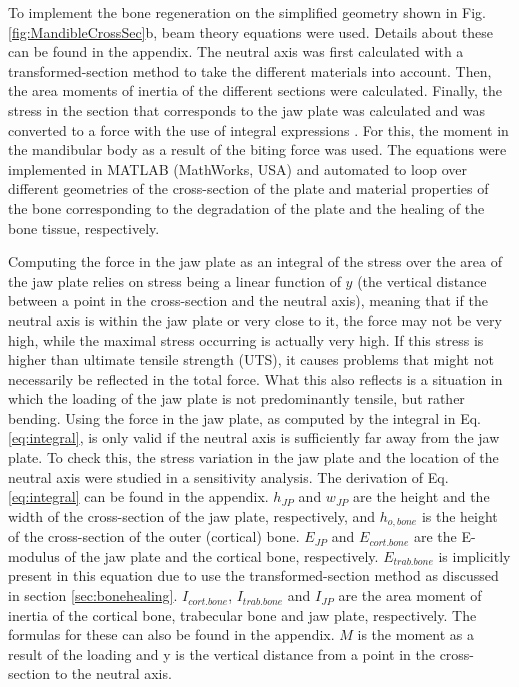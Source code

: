To implement the bone regeneration on the simplified geometry shown in Fig. \ref{fig:MandibleCrossSec}b, beam theory equations were used. Details about these can be found in the appendix. The neutral axis was first calculated with a transformed-section method to take the different materials into account. Then, the area moments of inertia of the different sections were calculated. Finally, the stress in the section that corresponds to the jaw plate was calculated and was converted to a force with the use of integral expressions \cite{beamtheory}. For this, the moment in the mandibular body as a result of the biting force was used. The equations were implemented in MATLAB (MathWorks, USA) and automated to loop over different geometries of the cross-section of the plate and material properties of the bone corresponding to the degradation of the plate and the healing of the bone tissue, respectively.

Computing the force in the jaw plate as an integral of the stress over the area of the jaw plate relies on stress being a linear function of $y$ (the vertical distance between a point in the cross-section and the neutral axis), meaning that if the neutral axis is within the jaw plate or very close to it, the force may not be very high, while the maximal stress occurring is actually very high. If this stress is higher than ultimate tensile strength ({UTS}), it causes problems that might not necessarily be reflected in the total force. What this also reflects is a situation in which the loading of the jaw plate is not predominantly tensile, but rather bending. Using the force in the jaw plate, as computed by the integral in Eq. \ref{eq:integral}, is only valid if the neutral axis is sufficiently far away from the jaw plate. To check this, the stress variation in the jaw plate and the location of the neutral axis were studied in a sensitivity analysis. The derivation of Eq. \ref{eq:integral} can be found in the appendix. $h_{JP}$ and $w_{JP}$ are the height and the width of the cross-section of the jaw plate, respectively, and $h_{o,bone}$ is the height of the cross-section of the outer (cortical) bone. $E_{JP}$ and $E_{cort.bone}$ are the E-modulus of the jaw plate and the cortical bone, respectively. $E_{trab.bone}$ is implicitly present in this equation due to use the transformed-section method as discussed in section \ref{sec:bonehealing}. $I_{cort.bone}$, $I_{trab.bone}$ and $I_{JP}$ are the area moment of inertia of the cortical bone, trabecular bone and jaw plate, respectively. The formulas for these can also be found in the appendix. $M$ is the moment as a result of the loading and y is the vertical distance from a point in the cross-section to the neutral axis.

